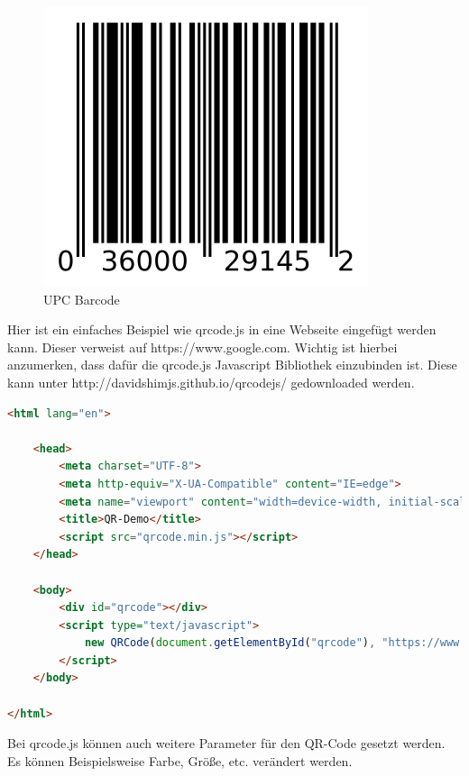 \begin{figure}[H]
    \centering
    \includegraphics[scale=0.8]{pics/UPCBarcode.png}
    \caption{UPC Barcode}
    \label{fig:tech:barcode}
\end{figure}


Hier ist ein einfaches Beispiel wie qrcode.js in eine Webseite eingefügt werden kann.
Dieser verweist auf https://www.google.com. Wichtig ist hierbei anzumerken, dass dafür die qrcode.js Javascript Bibliothek einzubinden ist.
Diese kann unter http://davidshimjs.github.io/qrcodejs/ gedownloaded werden.
\begin{lstlisting}[language=html,caption=QR-Code Demo,label=lst:tech:gaussianBlur]
<html lang="en">

    <head>
        <meta charset="UTF-8">
        <meta http-equiv="X-UA-Compatible" content="IE=edge">
        <meta name="viewport" content="width=device-width, initial-scale=1.0">
        <title>QR-Demo</title>
        <script src="qrcode.min.js"></script>
    </head>
    
    <body>
        <div id="qrcode"></div>
        <script type="text/javascript">
            new QRCode(document.getElementById("qrcode"), "https://www.google.com");
        </script>
    </body>
    
</html>
\end{lstlisting}

Bei qrcode.js können auch weitere Parameter für den QR-Code gesetzt werden. Es können
Beispielsweise Farbe, Größe, etc. verändert werden.

